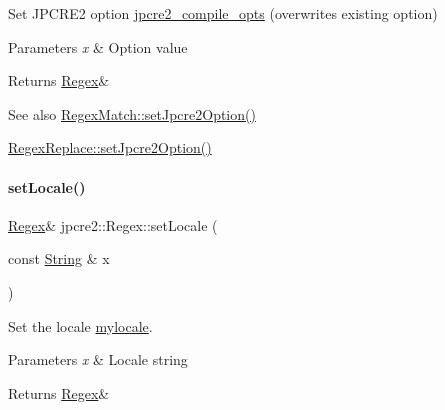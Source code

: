 Set J\+P\+C\+R\+E2 option \hyperlink{classjpcre2_1_1Regex_abdd26c3bc1c3132f0aa73dde1690a7ef}{jpcre2\+\_\+compile\+\_\+opts} (overwrites existing option) 


\begin{DoxyParams}{Parameters}
{\em x} & Option value \\
\hline
\end{DoxyParams}
\begin{DoxyReturn}{Returns}
\hyperlink{classjpcre2_1_1Regex}{Regex}\& 
\end{DoxyReturn}
\begin{DoxySeeAlso}{See also}
\hyperlink{classjpcre2_1_1RegexMatch_a0d76033d9c134caa9ddfc21849603920_a0d76033d9c134caa9ddfc21849603920}{Regex\+Match\+::set\+Jpcre2\+Option()} 

\hyperlink{classjpcre2_1_1RegexReplace_a745ab0b979035214a83ed0a04686ef6a_a745ab0b979035214a83ed0a04686ef6a}{Regex\+Replace\+::set\+Jpcre2\+Option()} 
\end{DoxySeeAlso}
\hypertarget{classjpcre2_1_1Regex_a56721534519e5cb436337043eee8f42d_a56721534519e5cb436337043eee8f42d}{}\label{classjpcre2_1_1Regex_a56721534519e5cb436337043eee8f42d_a56721534519e5cb436337043eee8f42d} 
\paragraph{\texorpdfstring{set\+Locale()}{setLocale()}}
{\footnotesize\ttfamily \hyperlink{classjpcre2_1_1Regex}{Regex}\& jpcre2\+::\+Regex\+::set\+Locale (\begin{DoxyParamCaption}\item[{const \hyperlink{namespacejpcre2_a91f03070152fb228bc116c5a737f1d16}{String} \&}]{x }\end{DoxyParamCaption})\hspace{0.3cm}{\ttfamily [inline]}}



Set the locale \hyperlink{classjpcre2_1_1Regex_a92a3ad992cade62d103248302f7e2f2d}{mylocale}. 


\begin{DoxyParams}{Parameters}
{\em x} & Locale string \\
\hline
\end{DoxyParams}
\begin{DoxyReturn}{Returns}
\hyperlink{classjpcre2_1_1Regex}{Regex}\& 
\end{DoxyReturn}
\hypertarget{classjpcre2_1_1Regex_aed9865b58c60945e19f36fa310f5a595_aed9865b58c60945e19f36fa310f5a595}{}\label{classjpcre2_1_1Regex_aed9865b58c60945e19f36fa310f5a595_aed9865b58c60945e19f36fa310f5a595} 
